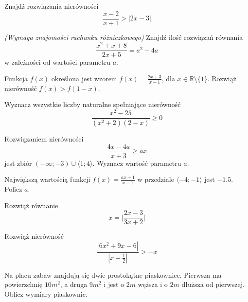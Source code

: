 \zadanie Znajdź rozwiązania nierówności \[ \dfrac{x - 2}{x + 1} > |2x - 3| \]

\zadanie \textit{(Wymaga znajomości rachunku różniczkowego)} Znajdź ilość rozwiązań równania \[ \dfrac{x^2 + x + 8}{2x + 5} = a^2 - 4a \] w zależności od wartości parametru $a$.

\zadanie Funkcja $f(x)$ określona jest wzorem $f(x) = \frac{2x + 3}{x - 1}$, dla ${x \in \mathbb{R} \setminus \{1\}}$. Rozwiąż nierówność $f(x) > f(1 - x)$.

\zadanie Wyznacz wszystkie liczby naturalne spełniające nierówność \[\dfrac{x^2 - 25}{(x^2 + 2)(2 - x)} \geqslant 0\]

\zadanie Rozwiązaniem nierówności \[ \dfrac{4x - 4a}{x + 3} \geqslant ax \] jest zbiór $(-\infty; -3) \cup \langle 1; 4 \rangle$. Wyznacz wartość parametru $a$.

\zadanie Największą wartością funkcji $f(x) = \frac{ax + 1}{x - 1}$ w przedziale $\langle -4; -1 \rangle$ jest $-1.5$. Policz $a$.

\zadanie Rozwiąż równanie \[ x = \bigg|\dfrac{2x - 3}{3x + 2}\bigg|\]

\zadanie Rozwiąż nierówność \[ \dfrac{|6x^2 + 9x - 6|}{|x - \frac{1}{2}|} > -x\]

\zadanie Na placu zabaw znajdują się dwie prostokątne piaskownice. Pierwsza ma powierzchnię $10 m^2$, a druga $9 m^2$ i jest o $2 m$ węższa i o $2 m$ dłuższa od pierwszej. Oblicz wymiary piaskownic. 
